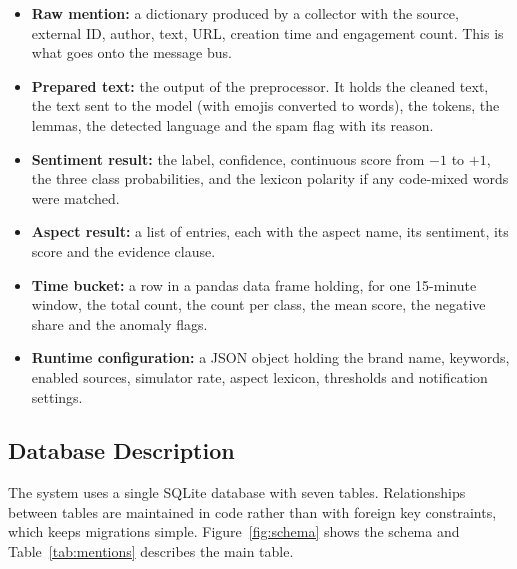 \documentclass[12pt,a4paper]{report}
\begin{document}
\begin{itemize}
    \item \textbf{Raw mention:} a dictionary produced by a collector with the source, external ID, author, text, URL, creation time and engagement count. This is what goes onto the message bus.
    \item \textbf{Prepared text:} the output of the preprocessor. It holds the cleaned text, the text sent to the model (with emojis converted to words), the tokens, the lemmas, the detected language and the spam flag with its reason.
    \item \textbf{Sentiment result:} the label, confidence, continuous score from $-1$ to $+1$, the three class probabilities, and the lexicon polarity if any code-mixed words were matched.
    \item \textbf{Aspect result:} a list of entries, each with the aspect name, its sentiment, its score and the evidence clause.
    \item \textbf{Time bucket:} a row in a pandas data frame holding, for one 15-minute window, the total count, the count per class, the mean score, the negative share and the anomaly flags.
    \item \textbf{Runtime configuration:} a JSON object holding the brand name, keywords, enabled sources, simulator rate, aspect lexicon, thresholds and notification settings.
\end{itemize}

\subsection{Database Description}

The system uses a single SQLite database with seven tables. Relationships between tables are maintained in code rather than with foreign key constraints, which keeps migrations simple. Figure~\ref{fig:schema} shows the schema and Table~\ref{tab:mentions} describes the main table.
\end{document}
